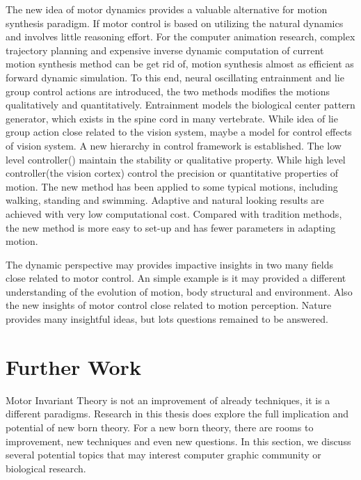 The new idea of motor dynamics provides a valuable alternative for motion synthesis paradigm.
If motor control is based on utilizing the natural dynamics and involves little reasoning effort.
For the computer animation research, complex trajectory planning and expensive inverse dynamic computation of current motion synthesis method can be get rid of,  motion synthesis almost as efficient as forward dynamic simulation.
To this end, neural oscillating entrainment and lie group control actions are introduced, the two methods modifies the motions qualitatively and quantitatively.
Entrainment  models the biological center pattern generator, which exists in the spine cord in many vertebrate.
While idea of lie group action close related to the vision system, maybe a model for control effects of vision system.
A new hierarchy in control framework is established.
The low level controller(\cpg) maintain the stability or qualitative property.
While high level controller(the vision cortex) control the precision or quantitative properties of motion.
The new method has been applied to some typical motions, including walking, standing and swimming.
Adaptive and natural looking results are achieved with very low computational cost.
Compared with tradition methods, the new method is more easy to set-up and has fewer parameters in adapting motion.


The dynamic perspective may provides impactive insights in two many fields close related to motor control.
An simple example is it may provided a different understanding of the evolution of motion, body structural and environment.
Also the new insights of motor control close related to motion perception.
Nature provides many insightful ideas, but lots questions remained to be answered.













 




\section{Further Work}
Motor Invariant Theory is not an improvement of already \cms techniques, it is a different paradigms.
Research in this thesis does explore the full implication and potential of new born theory.
For a new born theory, there are rooms to improvement, new techniques and even new questions.
In this section, we discuss several potential topics that may interest computer graphic community or biological research.

